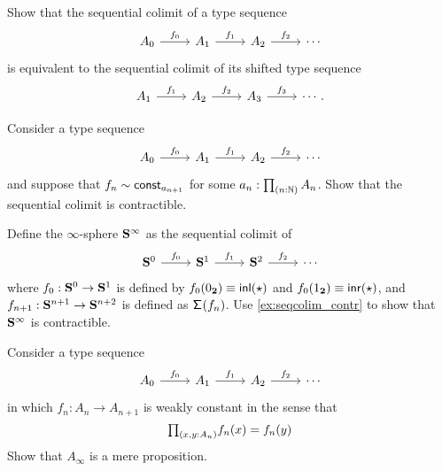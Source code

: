 \begin{exercises}
\item \label{ex:seqcolim_shift}
Show that the sequential colimit of a type sequence
\begin{equation*}
\begin{tikzcd}
A_0 \arrow[r,"f_0"] & A_1 \arrow[r,"f_1"] & A_2 \arrow[r,"f_2"] & \cdots
\end{tikzcd}
\end{equation*}
is equivalent to the sequential colimit of its shifted type sequence
\begin{equation*}
\begin{tikzcd}
A_1 \arrow[r,"f_1"] & A_2 \arrow[r,"f_2"] & A_3 \arrow[r,"f_3"] & \cdots.
\end{tikzcd}
\end{equation*}
\item \label{ex:seqcolim_contr}Consider a type sequence
\begin{equation*}
\begin{tikzcd}
A_0 \arrow[r,"f_0"] & A_1 \arrow[r,"f_1"] & A_2 \arrow[r,"f_2"] & \cdots
\end{tikzcd}
\end{equation*}
and suppose that $f_n\sim \mathsf{const}_{a_{n+1}}$ for some $a_n:\prd{n:\N}A_n$. Show that the sequential colimit is contractible.
\item Define the $\infty$-sphere $\mathbf{S}^{\infty}$ as the sequential colimit of
\begin{equation*}
\begin{tikzcd}
\sphere{0} \arrow[r,"f_0"] & \sphere{1} \arrow[r,"f_1"] & \sphere{2} \arrow[r,"f_2"] & \cdots
\end{tikzcd}
\end{equation*}
where $f_0:\mathbf{S}^{0}\to\mathbf{S}^{1}$ is defined by $f_0({0_{\mathbf{2}}})\equiv {\mathsf{inl}}(\star)$ and $f_0({1_{\mathbf{2}}})\equiv {\mathsf{inr}}(\star)$, and $f_{n+1}:\mathbf{S}^{n+1}\to\mathbf{S}^{n+2}$ is defined as $\mathsf{\Sigma}^{}(f_n)$. Use \cref{ex:seqcolim_contr} to show that $\mathbf{S}^{\infty}$ is contractible.
\item Consider a type sequence
\begin{equation*}
\begin{tikzcd}
A_0 \arrow[r,"f_0"] & A_1 \arrow[r,"f_1"] & A_2 \arrow[r,"f_2"] & \cdots
\end{tikzcd}
\end{equation*}
in which $f_n:A_n\to A_{n+1}$ is weakly constant in the sense that
\begin{equation*}
\prd{x,y:A_n} f_n(x)=f_n(y)
\end{equation*}
Show that $A_\infty$ is a mere proposition.
\end{exercises}
